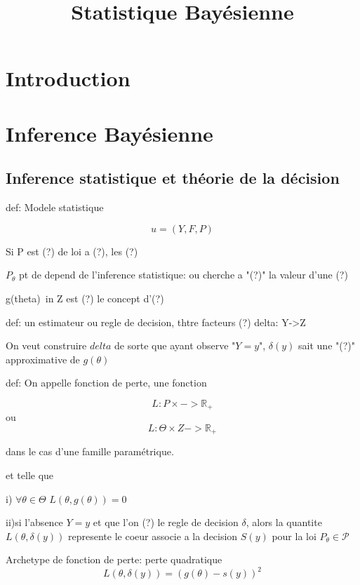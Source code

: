 \documentclass{article}
\title{Statistique Bay\'esienne}
\begin{document}
\maketitle

\tableofcontents
\pagebreak

\section{Introduction}
\section{Inference Bay\'esienne}
\subsection{Inference statistique et th\'eorie de la d\'ecision}
def: Modele statistique

\begin{equation}
u = (Y,F,P)
\end{equation}
	
Si P est (?) de loi a (?), les (?) 

$P_\theta$
pt de depend de l'inference statistique:
ou cherche a "(?)" la valeur d'une (?)

g(theta)\ in Z est (?) le concept d'(?)

def: un estimateur ou regle de decision, thtre facteurs (?)
delta: Y->Z

On veut construire $delta$ de sorte que ayant observe "$Y=y$", $\delta (y)$ sait une "(?)" approximative de $g(\theta)$

def: On appelle fonction de perte, une fonction 

\begin{equation}
	L: P\times -> \mathbb{R}_+
\end{equation}
ou
\begin{equation}
	L:\Theta\times Z -> \mathbb{R}_+
\end{equation}

dans le cas d'une famille paramétrique.

et telle que

i) $\forall \theta \in \Theta$
$L(\theta,g(\theta)) = 0$

ii)si l'absence $Y=y$ et que l'on (?) le regle de decision $\delta$, alors la quantite $L(\theta,\delta(y))$ represente le coeur associe a la decision
$S(y)$ pour la loi $P_\theta \in \mathscr{P}$

Archetype de fonction de perte: perte quadratique
\begin{equation}
	L(\theta, \delta(y)) = (g(\theta) - s(y))^2
\end{equation}
\end{document}
